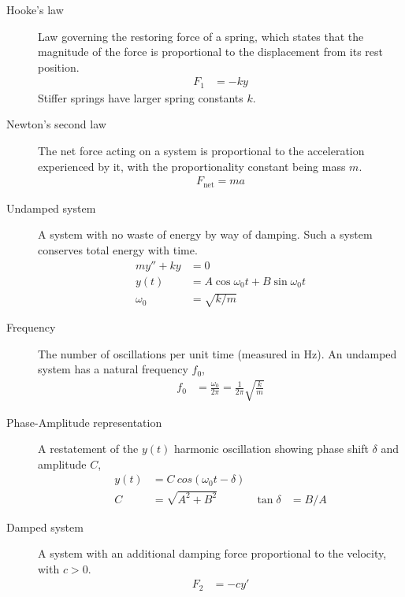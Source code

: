 \begin{description}
    \item[Hooke's law] Law governing the restoring force of a spring, which states that the
        magnitude of the force is proportional to the displacement from its rest position.
        \begin{align}
            F_{1} & = -ky
        \end{align}
        Stiffer springs have larger spring constants $ k $.
    \item[Newton's second law] The net force acting on a system is proportional to the
        acceleration experienced by it, with the proportionality constant being mass $ m $.
        \begin{align}
            F_{\text{net}} = ma
        \end{align}
    \item[Undamped system] A system with no waste of energy by way of damping. Such a system
        conserves total energy with time.
        \begin{align}
            my'' + ky  & = 0                                         \\
            y(t)       & = A \cos \omega_{0} t + B \sin \omega_{0} t \\
            \omega_{0} & = \sqrt{k/m}
        \end{align}
    \item[Frequency] The number of oscillations per unit time (measured in $\si{\hertz}$).
        An undamped system has a natural frequency $ f_{0} $,
        \begin{align}
            f_{0} & = \frac{\omega_{0}}{2\pi} = \frac{1}{2\pi} \sqrt{\frac{k}{m}}
        \end{align}
    \item[Phase-Amplitude representation] A restatement of the $ y(t) $ harmonic
        oscillation showing phase shift $ \delta $ and amplitude $ C $,
        \begin{align}
            y(t) & = C\ cos(\omega_{0}t - \delta)                       \\
            C    & = \sqrt{A^{2} + B^{2}}         & \tan \delta & = B/A
        \end{align}
    \item[Damped system] A system with an additional damping force proportional to
        the velocity, with $ c > 0 $.
        \begin{align}
            F_{2}           & = -cy' \\

\end{align}
\end{description}
